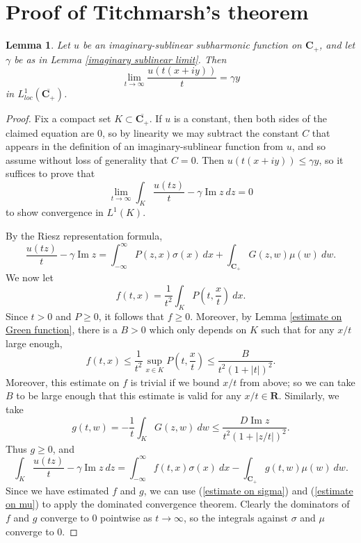 \documentclass[12pt]{report}
\newcommand{\RR}{\mathbf{R}}
\newcommand{\CC}{\mathbf{C}}
\renewcommand{\Im}{\operatorname{Im}}
\newtheorem{lemma}[theorem]{Lemma}
\theoremstyle{definition}
\theoremstyle{remark}
\begin{document}
\section{Proof of Titchmarsh's theorem}
\begin{lemma}
    \label{gamma in mean}
    Let $u$ be an imaginary-sublinear subharmonic function on $\CC_+$, and let $\gamma$ be as in Lemma \ref{imaginary sublinear limit}. Then
$$\lim_{t \to \infty} \frac{u(t(x + iy))}{t} = \gamma y$$
    in $L^1_{loc}(\overline{\CC_+})$.
\end{lemma}
\begin{proof}
    Fix a compact set $K \subset \overline{\CC_+}$. If $u$ is a constant, then both sides of the claimed equation are $0$, so by linearity we may subtract the constant $C$ that appears in the definition of an imaginary-sublinear function from $u$, and so assume without loss of generality that $C = 0$. Then $u(t(x+iy)) \leq \gamma y$, so it suffices to prove that
$$\lim_{t \to \infty} \int_K \frac{u(tz)}{t} - \gamma \Im z ~dz = 0$$
    to show convergence in $L^1(K)$.

    By the Riesz representation formula,
$$\frac{u(tz)}{t} - \gamma \Im z = \int_{-\infty}^\infty P(z, x) \sigma(x) ~dx + \int_{\CC_+} G(z, w) \mu(w) ~dw.$$
    We now let
    $$f(t, x) = \frac{1}{t^2} \int_K P\left(t, \frac{x}{t}\right) ~dx.$$
    Since $t > 0$ and $P \geq 0$, it follows that $f \geq 0$. Moreover, by Lemma \ref{estimate on Green function}, there is a $B > 0$ which only depends on $K$ such that for any $x/t$ large enough,
    $$f(t, x) \leq \frac{1}{t^2} \sup_{x \in K} P\left(t, \frac{x}{t}\right) \leq \frac{B}{t^2(1 + |t|)^2}.$$
    Moreover, this estimate on $f$ is trivial if we bound $x/t$ from above; so we can take $B$ to be large enough that this estimate is valid for any $x/t \in \RR$. Similarly, we take
    $$g(t, w) = -\frac{1}{t} \int_K G(z, w) ~dw \leq \frac{D \Im z}{t^2(1+|z/t|)^2}.$$
    Thus $g \geq 0$, and
    $$\int_K \frac{u(tz)}{t} - \gamma \Im z ~dz = \int_{-\infty}^\infty f(t, x) \sigma(x) ~dx - \int_{\CC_+} g(t, w) \mu(w) ~dw.$$
    Since we have estimated $f$ and $g$, we can use (\ref{estimate on sigma}) and (\ref{estimate on mu}) to apply the dominated convergence theorem. Clearly the dominators of $f$ and $g$ converge to $0$ pointwise as $t \to \infty$, so the integrals against $\sigma$ and $\mu$ converge to $0$.
\end{proof}
\end{document}

